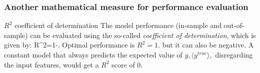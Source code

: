 \subsubsection{Another mathematical measure for performance evaluation}
\begin{mybox}{$R^2$ coefficient of determination}
	 The model performance (in-sample and out-of-sample) can be evaluated using the so-called \emph{coefficient of determination}, which is given by:
		\be
	\label{eq:errorR2}
	R^2=1-.
	\ee 
Optimal performance is $R^2=1$. but it can also be negative. A constant model that always predicts the expected value of $y, ⟨y^{true}⟩,$ disregarding the input features, would get a $R^2$ score of $0$.
\end{mybox}
















